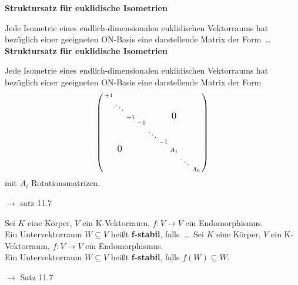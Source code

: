 \documentclass[11pt]{article}
\renewcommand{\cite}[1]{\par\bigskip\hfill{\color{gray}\tiny\(\to\) #1}}
\let\olddots\dots
\renewcommand{\dots}{\,\olddots\,}
\newenvironment{field}{}{\newpage}
\newif\ifnote
\newenvironment{note}{\notetrue}{\notefalse}
\newcommand{\localtag}{}
\newcommand{\globaltag}{}
\newcommand{\uuid}{}
\newcommand{\tags}[1]{
    \ifnote
        \renewcommand{\localtag}{#1}
    \else
        \renewcommand{\globaltag}{#1}
    \fi
    }
\newcommand{\xplain}[1]{\renewcommand{\uuid}{#1}}
\begin{document}
\begin{note}
    \begin{field}
        \textbf{Struktursatz für euklidische Isometrien}

        Jede Isometrie eines endlich-dimensionalen euklidischen Vektorraums hat bezüglich einer geeigneten ON-Basis eine darstellende Matrix der Form \dots
    \end{field}
    \begin{field}
        \textbf{Struktursatz für euklidische Isometrien}

        Jede Isometrie eines endlich-dimensionalen euklidischen Vektorraums hat bezüglich einer geeigneten ON-Basis eine darstellende Matrix der Form
        \[\left(\begin{smallmatrix}
            +1 \\
              & \ddots \\
              &        & +1 &  &       &  &     \mbox{\large 0}\\
              &        &    &-1\\
              &        &    &  &\ddots\\
              &        &    &  &       &-1\\
              &\mbox{\large 0}&    &  &       &  & A_1\\
              &        &    &  &       &  &     &\ddots\\
              &        &    &  &       &  &     &       & A_k\\
        \end{smallmatrix}\right)\]
        mit \(A_i\) Rotationsmatrizen. \cite{satz 11.7}
    \end{field}
\end{note}

\begin{note}
    \tags{Def}
    \xplain{b9b834fe-c30d-11ec-9d64-0242ac120002}

    \begin{field}
        Sei \(K\) eine Körper, \(V\) ein K-Vektorraum, \(f\colon V\rightarrow V\) ein Endomorphismus.\\
        Ein Untervektorraum \(W \subseteq V\) heißt \textbf{f-stabil}, falls \dots
    \end{field}
    \begin{field}
        Sei \(K\) eine Körper, \(V\) ein K-Vektorraum, \(f\colon V\rightarrow V\) ein Endomorphismus.\\
        Ein Untervektorraum \(W \subseteq V\) heißt \textbf{f-stabil}, falls $f(W)\subseteq W$.
        \cite{Satz 11.7}
    \end{field}
\end{note}
\end{document}
